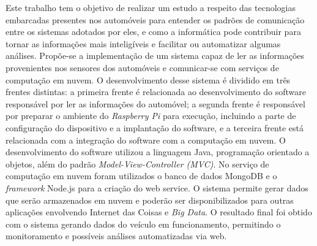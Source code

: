 
\setlength{\absparsep}{18pt} 
\begin{resumo}

\noindent 
Este trabalho tem o objetivo de realizar um estudo a respeito das tecnologias embarcadas presentes nos automóveis para entender os padrões de comunicação entre os sistemas adotados por eles, e como a informática pode contribuir para tornar as informações mais inteligíveis e facilitar ou automatizar algumas análises. Propõe-se a implementação de um sistema capaz de ler as informações provenientes nos sensores dos automóveis e comunicar-se com serviços de computação em nuvem. O desenvolvimento desse sistema é dividido em três frentes distintas: a primeira frente é relacionada ao desenvolvimento do software responsável por ler as informações do automóvel; a segunda frente é responsável por preparar o ambiente do \textit{Raspberry Pi} para execução, incluindo a parte de configuração do dispositivo e a implantação do software, e a terceira frente está relacionada com a integração do software com a computação em nuvem. O desenvolvimento do software utilizou a linguagem Java, programação orientado a objetos, além do padrão \textit{Model-View-Controller (MVC)}. No serviço de computação em nuvem foram utilizados o banco de dados MongoDB e o \textit{framework} Node.js para a criação do web service. O sistema permite gerar dados que serão armazenados em nuvem e poderão ser disponibilizados para outras aplicações envolvendo Internet das Coisas e \textit{Big Data}. O resultado final foi obtido com o sistema gerando dados do veículo em funcionamento, permitindo o monitoramento e possíveis análises automatizadas via web.

\vspace{1cm}


\end{resumo}
